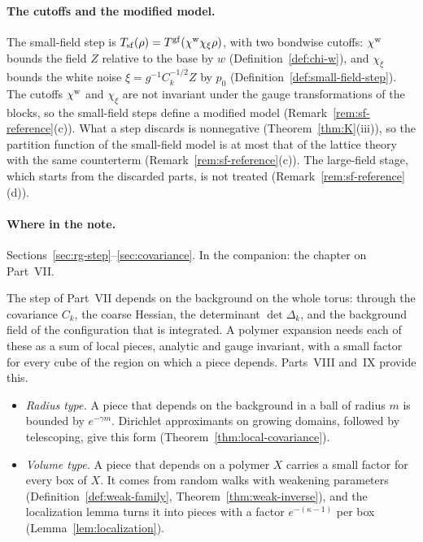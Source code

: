 \paragraph{The cutoffs and the modified model.} The small-field step is $T_{\rm sf}(\rho)=T^{\rm gf}(\chi^{\rm w}\chi_\xi\rho)$, with two bondwise cutoffs: $\chi^{\rm w}$ bounds the field $Z$ relative to the base by $w$ (Definition~\ref{def:chi-w}), and $\chi_\xi$ bounds the white noise $\xi=g^{-1}C_k^{-1/2}Z$ by $p_0$ (Definition~\ref{def:small-field-step}). The cutoffs $\chi^{\rm w}$ and $\chi_\xi$ are not invariant under the gauge transformations of the blocks, so the small-field steps define a modified model (Remark~\ref{rem:sf-reference}(c)). What a step discards is nonnegative (Theorem~\ref{thm:K}(iii)), so the partition function of the small-field model is at most that of the lattice theory with the same counterterm (Remark~\ref{rem:sf-reference}(c)). The large-field stage, which starts from the discarded parts, is not treated (Remark~\ref{rem:sf-reference}(d)).

\paragraph{Where in the note.} Sections~\ref{sec:rg-step}--\ref{sec:covariance}. In the companion: the chapter on Part~VII.

\label{g:localization}

The step of Part~VII depends on the background on the whole torus: through the covariance $C_k$, the coarse Hessian, the determinant $\det\Delta_k$, and the background field of the configuration that is integrated. A polymer expansion needs each of these as a sum of local pieces, analytic and gauge invariant, with a small factor for every cube of the region on which a piece depends. Parts~VIII and~IX provide this.
\begin{itemize}
\item \emph{Radius type.} A piece that depends on the background in a ball of radius $m$ is bounded by $e^{-\gamma m}$. Dirichlet approximants on growing domains, followed by telescoping, give this form (Theorem~\ref{thm:local-covariance}).
\item \emph{Volume type.} A piece that depends on a polymer $X$ carries a small factor for every box of $X$. It comes from random walks with weakening parameters (Definition~\ref{def:weak-family}, Theorem~\ref{thm:weak-inverse}), and the localization lemma turns it into pieces with a factor $e^{-(\kappa-1)}$ per box (Lemma~\ref{lem:localization}).
\end{itemize}

